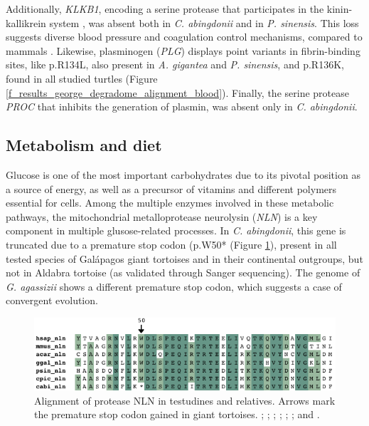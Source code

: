 Additionally, \textit{KLKB1}, encoding a serine protease that participates in the kinin-kallikrein system \cite{Wong2013}, was absent both in \textit{C. abingdonii} and in \textit{P. sinensis}.
This loss suggests diverse blood pressure and coagulation control mechanisms, compared to mammals \cite{Khan2007}.
Likewise, plasminogen (\textit{PLG}) displays point variants in fibrin-binding sites, like {p.R134L}, also present in \textit{A. gigantea} and \textit{P. sinensis}, and {p.R136K}, found in all studied turtles (Figure \ref{f_results_george_degradome_alignment_blood}). Finally, the serine protease \textit{PROC} that inhibits the generation of plasmin, was absent only in \textit{C. abingdonii}.

\subsection{Metabolism and diet} \label{ss_results_george_degradome_metabolism}

Glucose is one of the most important carbohydrates due to its pivotal position as a source of energy, as well as a precursor of vitamins and different polymers essential for cells.
Among the multiple enzymes involved in these metabolic pathways, the mitochondrial metalloprotease neurolysin (\textit{NLN}) is a key component in multiple glusose-related processes.
In \textit{C. abingdonii}, this gene is truncated due to a premature stop codon ({p.W50*} (Figure \ref{f_results_george_degradome_alignmet_nln}), present in all tested species of Gal\'{a}pagos giant tortoises and in their continental outgroups, but not in Aldabra tortoise (as validated through Sanger sequencing).
The genome of \textit{G. agassizii} shows a different premature stop codon, which suggests a case of convergent evolution.

\begin{figure}[t!]
    \begin{center}
        \includegraphics[width=\textwidth]{figures/alignment_nln.pdf}
        \caption[Alignment of protease NLN in testudines]{\footnotesize Alignment of protease NLN in testudines and relatives. Arrows mark the premature stop codon gained in giant tortoises. \hsap; \mmus; \acar; \ggal; \psin; \cpic; and \cabi.}
        \label{f_results_george_degradome_alignmet_nln}
    \end{center}
\end{figure}

